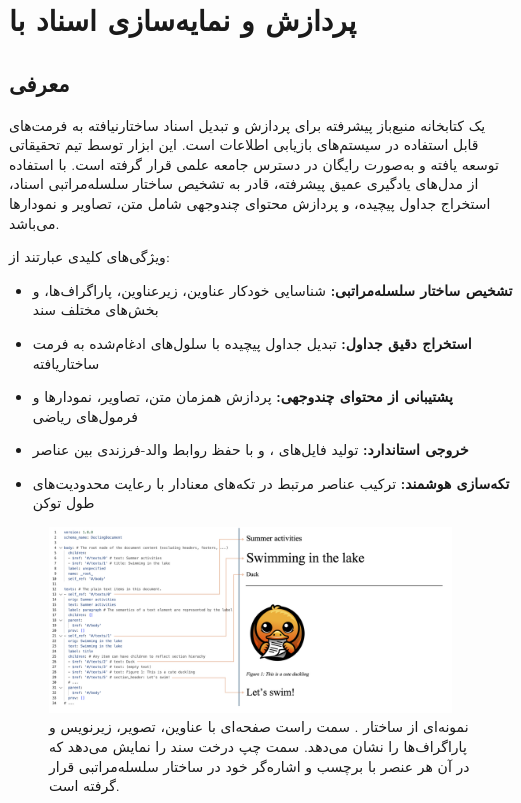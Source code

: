 
\section{پردازش و نمایه‌سازی اسناد با }

\subsection{معرفی }
 یک کتابخانه منبع‌باز پیشرفته برای پردازش و تبدیل اسناد ساختارنیافته به فرمت‌های قابل استفاده در سیستم‌های بازیابی اطلاعات است. این ابزار توسط تیم تحقیقاتی  توسعه یافته و به‌صورت رایگان در دسترس جامعه علمی قرار گرفته است.  با استفاده از مدل‌های یادگیری عمیق پیشرفته، قادر به تشخیص ساختار سلسله‌مراتبی اسناد، استخراج جداول پیچیده، و پردازش محتوای چندوجهی شامل متن، تصاویر و نمودارها می‌باشد.

\noindent
ویژگی‌های کلیدی  عبارتند از:
\begin{itemize}
    \item \textbf{تشخیص ساختار سلسله‌مراتبی:} شناسایی خودکار عناوین، زیرعناوین، پاراگراف‌ها، و بخش‌های مختلف سند
    \item \textbf{استخراج دقیق جداول:} تبدیل جداول پیچیده با سلول‌های ادغام‌شده به فرمت ساختاریافته
    \item \textbf{پشتیبانی از محتوای چندوجهی:} پردازش همزمان متن، تصاویر، نمودارها و فرمول‌های ریاضی
    \item \textbf{خروجی استاندارد:} تولید فایل‌های  ،  و  با حفظ روابط والد-فرزندی بین عناصر
    \item \textbf{تکه‌سازی هوشمند:} ترکیب عناصر مرتبط در تکه‌های معنادار با رعایت محدودیت‌های طول توکن
\end{itemize}

\begin{figure}[!htbp]
    \centering
    \includegraphics[width=0.95\textwidth]{docling_doc_hierarchy_1.png}
    \caption{نمونه‌ای از ساختار . سمت راست صفحه‌ای با عناوین، تصویر، زیرنویس و پاراگراف‌ها را نشان می‌دهد. سمت چپ درخت سند را نمایش می‌دهد که در آن هر عنصر با برچسب و اشاره‌گر خود در ساختار سلسله‌مراتبی قرار گرفته است.}
    \label{fig:docling_structure}
\end{figure}

